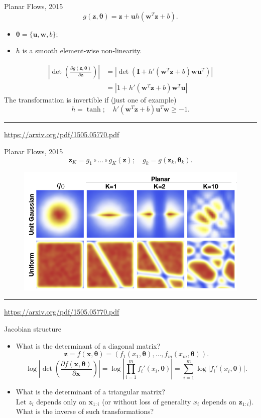 \documentclass{beamer}
\newcommand{\bu}{\mathbf{u}}
\newcommand{\bw}{\mathbf{w}}
\newcommand{\bx}{\mathbf{x}}
\newcommand{\bz}{\mathbf{z}}
\newcommand{\bI}{\mathbf{I}}
\newcommand{\btheta}{\boldsymbol{\theta}}
\begin{document}
\begin{frame}{Planar Flows, 2015}
	\vspace{-0.2cm}
	\[
	g(\bz, \btheta) = \bz + \mathbf{u} h(\bw^T\bz + b).
	\]
	\vspace{-0.2cm}
	\begin{itemize}
		\item $\btheta = \{\bu, \bw, b\}$;
		\item $h$ is a smooth element-wise non-linearity.
	\end{itemize}
	\begin{align*}
		\left| \det \left( \frac{\partial g(\bz, \btheta)}{\partial \bz} \right)\right| &= \left| \det \left( \bI +  h'(\bw^T \bz + b) \bw\bu^T\right) \right| \\
		&= \left| 1 + h'(\bw^T \bz + b) \bw^T \bu \right|
	\end{align*}
	The transformation is invertible if (just one of example)
	\[
	h = \tanh; \quad h'(\bw^T \bz + b) \bu^T \bw \geq -1.
	\]
	\vfill
	\hrule\medskip
	{\scriptsize \href{https://arxiv.org/pdf/1505.05770.pdf}{https://arxiv.org/pdf/1505.05770.pdf}} 
\end{frame}
\begin{frame}{Planar Flows, 2015}
	\[
	\bz_K = g_1 \circ \dots \circ g_K (\bz); \quad g_k = g(\bz_k, \btheta_k).
	\]
	\begin{figure}
		\centering
		\includegraphics[width=0.9\linewidth]{figs/planar_flows.png}
	\end{figure}
	\vfill
	\hrule\medskip
	{\scriptsize \href{https://arxiv.org/pdf/1505.05770.pdf}{https://arxiv.org/pdf/1505.05770.pdf}} 
\end{frame}
\begin{frame}{Jacobian structure}
	\begin{itemize}
		\item What is the determinant of a diagonal matrix?
		\[
		\bz = f(\bx, \btheta) = (f_1(x_1, \btheta), \dots, f_m(x_m, \btheta)).
		\]
		\[
		\log \left|\det \left( \frac{\partial f(\bx, \btheta)}{\partial \bx} \right) \right| = \log \left| \prod_{i=1}^m f_i'(x_i, \btheta) \right| = \sum_{i=1}^m \log \left| f_i'(x_i, \btheta) \right|.
		\]
		\item What is the determinant of a triangular matrix? \\
		Let $z_i$ depends only on $\bx_{1:i}$ (or without loss of generality $x_i$ depends on $\bz_{1:i}$). \\
		What is the inverse of such transformations?
	\end{itemize}
\end{frame}
\end{document}

